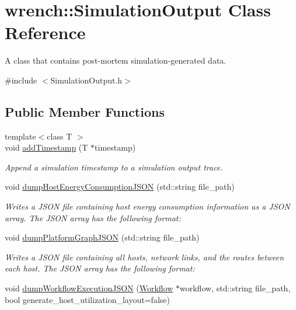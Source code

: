 \hypertarget{classwrench_1_1_simulation_output}{}\section{wrench\+:\+:Simulation\+Output Class Reference}
\label{classwrench_1_1_simulation_output}


A class that contains post-\/mortem simulation-\/generated data.  




{\ttfamily \#include $<$Simulation\+Output.\+h$>$}

\subsection*{Public Member Functions}
\begin{DoxyCompactItemize}
\item 
{\footnotesize template$<$class T $>$ }\\void \hyperlink{classwrench_1_1_simulation_output_ae5d690148a4ca7ac204c826e2acfc7c9}{add\+Timestamp} (T $\ast$timestamp)
\begin{DoxyCompactList}\small\item\em Append a simulation timestamp to a simulation output trace. \end{DoxyCompactList}\item 
void \hyperlink{classwrench_1_1_simulation_output_a789834c9727ec0cd28faaf5176eaeecf}{dump\+Host\+Energy\+Consumption\+J\+S\+ON} (std\+::string file\+\_\+path)
\begin{DoxyCompactList}\small\item\em Writes a J\+S\+ON file containing host energy consumption information as a J\+S\+ON array.  The J\+S\+ON array has the following format\+: \end{DoxyCompactList}\item 
void \hyperlink{classwrench_1_1_simulation_output_ac30cdf1fcfe9f3c61351d49acc36db52}{dump\+Platform\+Graph\+J\+S\+ON} (std\+::string file\+\_\+path)
\begin{DoxyCompactList}\small\item\em Writes a J\+S\+ON file containing all hosts, network links, and the routes between each host.  The J\+S\+ON array has the following format\+: \end{DoxyCompactList}\item 
void \hyperlink{classwrench_1_1_simulation_output_a7a85709b2581c90b53c217e6805cf56c}{dump\+Workflow\+Execution\+J\+S\+ON} (\hyperlink{classwrench_1_1_workflow}{Workflow} $\ast$workflow, std\+::string file\+\_\+path, bool generate\+\_\+host\+\_\+utilization\+\_\+layout=false)

\end{DoxyCompactItemize}
